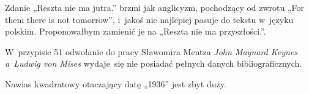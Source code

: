 \documentclass[a4paper,11pt]{article}
\begin{document}
\noindent
{} Zdanie „Reszta nie ma jutra.” brzmi jak anglicyzm,
pochodzący od zwrotu „For them there is not tomorrow”, i~jakoś nie
najlepiej pasuje do tekstu w~języku polskim. Proponowałbym zamienić je na
„Reszta nie ma przyszłości.”.

\vspace{\spaceFour}





\noindent
{} W~przypisie 51 odwołanie do pracy Sławomira Mentza \textit{John
  Maynard Keynes a~Ludwig von Mises} wydaje~się nie posiadać pełnych danych
bibliograficznych.

\vspace{\spaceFour}





\noindent
{} Nawias kwadratowy otaczający datę „1936” jest zbyt duży.

\vspace{\spaceFour}










\newpage

\end{document}
